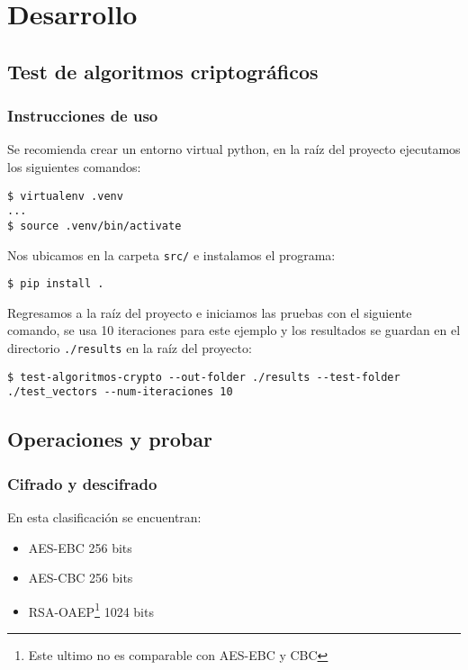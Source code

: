 \documentclass[../main.tex]{subfiles}
\begin{document}
\section{Desarrollo}\label{sec:desarrollo}

\subsection{Test de algoritmos criptográficos}\label{test-de-algoritmos-criptograficos}

\subsubsection{Instrucciones de uso}\label{instrucciones-de-uso}

Se recomienda crear un entorno virtual python, en la raíz
del proyecto ejecutamos los siguientes comandos:

\begin{code}
\begin{verbatim}
$ virtualenv .venv
...
$ source .venv/bin/activate
\end{verbatim}
\end{code}

Nos ubicamos en la carpeta \texttt{src/} e instalamos el programa:
\begin{code}
\begin{verbatim}
$ pip install .
\end{verbatim}
\end{code}

Regresamos a la raíz del proyecto e iniciamos las pruebas con el siguiente
comando, se usa 10 iteraciones para este ejemplo y los resultados se guardan en
el directorio \texttt{./results} en la raíz del proyecto:
\begin{code}
\begin{verbatim}
$ test-algoritmos-crypto --out-folder ./results --test-folder ./test_vectors --num-iteraciones 10
\end{verbatim}
\end{code}

\subsection{Operaciones y probar}\label{clasificaciuxf2n-de-operaciones}
\subsubsection{Cifrado y descifrado}\label{sec:cifrado-y-descifrado}
En esta clasificación se encuentran:
\begin{itemize}
  \item AES-EBC 256 bits
  \item AES-CBC 256 bits
  \item RSA-OAEP\footnote{Este ultimo no es comparable con AES-EBC y CBC} 1024 bits
\end{itemize}
\end{document}

